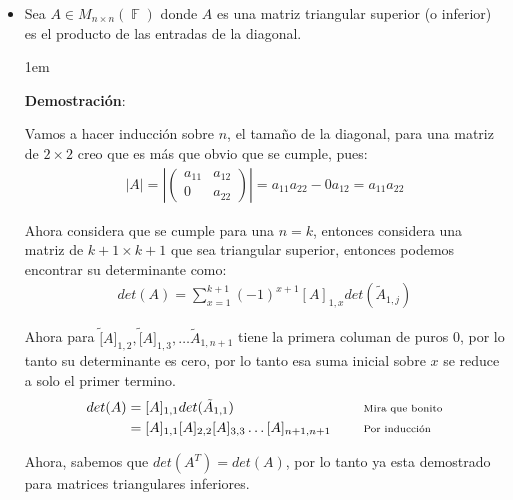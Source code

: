 \documentclass[12pt, fleqn]{article}                             %
\newenvironment{SmallIndentation}[1][0.75em]                    %
        {\begin{adjustwidth}{#1}{}\begin{footnotesize}}             %
        {\end{footnotesize}\end{adjustwidth}}                       %
\DeclareMathOperator \Space {\quad}                             %
\newcommand \Remember[1]{\Space\text{\scriptsize{#1}}}          %
\theoremstyle{break}                                            %
\DeclareMathOperator \GenericField {\mathbb{F}}                 %
\newcommand{\Mag}[1]{\left| #1 \right|}                         %
\newcommand{\pVector}[1]                                        %
        { \ensuremath{\begin{pmatrix}#1\end{pmatrix}} }             %
\begin{document}
   \begin{itemize}
       \item
            Sea $A \in M_{n \times n}(\GenericField)$ donde $A$ es una matriz triangular
            superior (o inferior) es el producto de las entradas de la diagonal.

            \begin{SmallIndentation}[1em]
                \textbf{Demostración}:
                
                Vamos a hacer inducción sobre $n$, el tamaño de la diagonal, para una matriz de $2 \times 2$
                creo que es más que obvio que se cumple, pues:
                \begin{align*}
                    |A| = \Mag{\pVector{a_{11} & a_{12} \\ 0 & a_{22}}} = a_{11}a_{22} - 0a_{12} = a_{11}a_{22}
                \end{align*}

                Ahora considera que se cumple para una $n = k$, entonces considera una matriz de $k+1 \times k+1$
                que sea triangular superior, entonces podemos encontrar su determinante como:
                \begin{align*}
                    det(A) = \sum_{x = 1}^{k+1} (-1)^{x + 1} [A]_{1, x} det(\tilde A _{1, j})     
                \end{align*} 

                Ahora para $\tilde [A]_{1, 2}, \tilde [A]_{1, 3}, \dots \tilde A_{1, n +1}$ tiene la primera
                columan de puros 0, por lo tanto su determinante es cero, por lo tanto esa suma inicial sobre $x$
                se reduce a solo el primer termino.
                \begin{align*}
                    det(A) 
                        &= [A]_{1, 1} det(\tilde A _{1, 1})
                            && \Remember{Mira que bonito}                       \\
                        &= [A]_{1, 1} [A]_{2, 2} [A]_{3, 3} \dots [A]_{n+1, n+1}
                            && \Remember{Por inducción}
                \end{align*}

                Ahora, sabemos que $det(A^T) = det(A)$, por lo tanto ya esta demostrado para matrices
                triangulares inferiores.

            \end{SmallIndentation}



\end{itemize}
\end{document}
